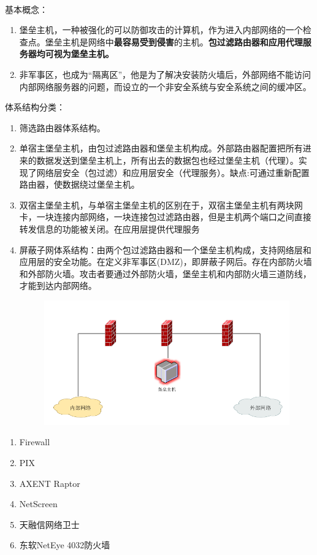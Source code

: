 \hspace{2em}\\
基本概念：
\begin{enumerate}
	\item 堡垒主机，一种被强化的可以防御攻击的计算机，作为进入内部网络的一个检查点。堡垒主机是网络中\textbf{最容易受到侵害}的主机。\textbf{包过滤路由器和应用代理服务器均可视为堡垒主机。}
	\item 非军事区，也成为“隔离区”，他是为了解决安装防火墙后，外部网络不能访问内部网络服务器的问题，而设立的一个非安全系统与安全系统之间的缓冲区。
\end{enumerate}
体系结构分类：
\begin{enumerate}
	\item 筛选路由器体系结构。
	\item 单宿主堡垒主机，由包过滤路由器和堡垒主机构成。外部路由器配置把所有进来的数据发送到堡垒主机上，所有出去的数据包也经过堡垒主机（代理）。实现了网络层安全（包过滤）和应用层安全（代理服务）。缺点:可通过重新配置路由器，使数据绕过堡垒主机。
	\item 双宿主堡垒主机，与单宿主堡垒主机的区别在于，双宿主堡垒主机有两块网卡，一块连接内部网络，一块连接包过滤路由器，但是主机两个端口之间直接转发信息的功能被关闭。在应用层提供代理服务
	\item 屏蔽子网体系结构：由两个包过滤路由器和一个堡垒主机构成，支持网络层和应用层的安全功能。在定义非军事区(DMZ)，即屏蔽子网后。存在内部防火墙和外部防火墙。攻击者要通过外部防火墙，堡垒主机和内部防火墙三道防线，才能到达内部网络。
	\begin{figure}[H]
		\centering
		\includegraphics[width=0.7\linewidth]{figures/screenshot001}
		\caption{}
		\label{fig:screenshot001}
	\end{figure}
\end{enumerate}

\begin{enumerate}
	\item Firewall
	\item PIX
	\item AXENT Raptor
	\item NetScreen
	\item 天融信网络卫士
	\item 东软NetEye  4032防火墙
\end{enumerate}





